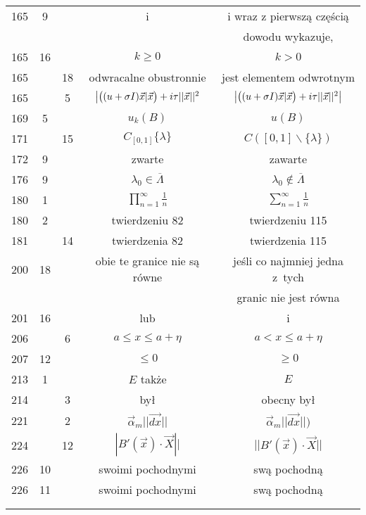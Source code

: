 \documentclass[a4paper]{article}
\newcommand{\fr}{\frac}
\newcommand{\ol}{\overline}
\newcommand{\Sum}{\sum\limits}
\newcommand{\Prod}{\prod\limits}
\newcommand{\al}{\alpha}
\newcommand{\la}{\lambda}
\newcommand{\La}{\Lambda}
\newcommand{\ora}{\overrightarrow}
\newcommand{\bs}{\backslash}
\begin{document}
\begin{center}
\begin{tabular}{|c|c|c|c|c|}
    165 & 9 & & i & i wraz z pierwszą częścią \\
    & & & & dowodu wykazuje, \\
    165 & 16 & & $k \geq 0$ & $k > 0$ \\
    165 & & 18 & odwracalne obustronnie & jest elementem odwrotnym \\
    165 & & 5 & $\big{ | } \big( ( u + \sigma I ) \vec{ x }
                | \vec{ x } \big) + i \tau || \vec{ x } ||^{ 2 }$
           & $\big{ | } \big( ( u + \sigma I ) \vec{ x } | \vec{ x } \big)
             + i \tau || \vec{ x } ||^{ 2 } \big{ | }$ \\
    169 & 5 & & $u_{ k }( B )$ & $u( B )$ \\
    171 & & 15 & $C_{ [ 0, 1 ] } \{ \lambda \}$ & $C( [ 0, 1 ] \bs
                                                  \{ \lambda \} )$ \\
    172 & 9 & & zwarte & zawarte \\
    176 & 9 & & $\la_{ 0 } \in \ol{ \La }$ & $\la_{ 0 }
                                             \notin \ol{ \La }$ \\
    180 & 1 & & $\Prod^{ \infty }_{ n = 1 } \fr{ 1 }{ n }$
           & $\Sum^{ \infty }_{ n = 1 } \frac{ 1 }{ n }$ \\
    180 & 2 & & twierdzeniu 82 & twierdzeniu 115 \\
    181 & & 14 & twierdzenia 82 & twierdzenia 115 \\
    200 & 18 & & obie te granice nie są równe & jeśli co najmniej
                                                jedna z~tych \\
    & & & & granic nie jest równa \\
    201 & 16 & & lub & i \\
    206 & & 6 & $a \leq x \leq a + \eta$ & $a < x \leq a + \eta$ \\
    207 & 12 & & $\leq 0$ & $\geq 0$ \\
    213 & 1 & & $E$ także & $E$ \\
    214 & & 3 & był & obecny był \\
    221 & & 2 & $\vec{ \al }_{ m } || \ora{ dx } ||$
           & $\vec{ \al }_{ m } || \ora{ dx } || )$ \\
    224 & & 12 & $| B'( \vec{ x } ) \cdot \vec{ X } ||$
           & $|| B'( \vec{ x } ) \cdot \vec{ X } ||$ \\
    226 & 10 & & swoimi pochodnymi & swą pochodną \\
    226 & 11 & & swoimi pochodnymi & swą pochodną \\
    & & & & \\
    & & & & \\ \hline
  \end{tabular}


\end{center}
\end{document}
